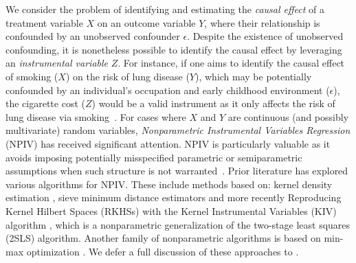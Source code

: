\documentclass[11pt]{article}
\newcommand{\0}{\mathbf{0}}
\begin{document}
We consider the problem of identifying and estimating the \emph{causal effect} of a treatment variable $X$ on an outcome variable $Y$, where their relationship is confounded by an unobserved confounder $\epsilon$. Despite the existence of unobserved confounding, it is nonetheless possible to identify the causal effect  by leveraging an \emph{instrumental variable} $Z$. For instance, if one aims to identify the causal effect of smoking ($X$) on the risk of lung disease ($Y$), which may be potentially confounded by an individual's occupation and early childhood environment ($\epsilon$), the cigarette cost ($Z$) would be a valid instrument as it only affects the risk of lung disease via smoking~\citep{leigh2004instrumental}. For cases where $X$ and $Y$ are continuous (and possibly multivariate) random variables, \emph{Nonparametric Instrumental Variables Regression} (NPIV) has received significant attention. NPIV is particularly valuable as it avoids imposing potentially misspecified parametric or semiparametric assumptions when such structure is not warranted~\citep{newey_2003, horowitz2011applied}. Prior literature has explored various algorithms for NPIV. These include methods based on: kernel density estimation \citep{HallHorowitz2005, darolles2011nonparametric}, sieve minimum distance estimators \citep{chen2012estimation, newey_2003, Chen_2018} and more recently Reproducing Kernel Hilbert Spaces (RKHSs) with the Kernel Instrumental Variables (KIV) algorithm \citep{singh2019kernel, meunier2024nonparametricinstrumentalregressionkernel}, which is a nonparametric generalization of the two-stage least squares (2SLS) algorithm. Another family of nonparametric algorithms is based on min-max optimization \citep{bennett2019deep, dikkala2020minimax, bennett2023minimax}. We defer a full discussion of these approaches to .
\end{document}
